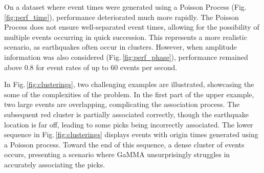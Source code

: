 \documentclass{scrreprt}
\begin{document}
On a dataset where event times were generated using a Poisson Process (Fig.\,\ref{fig:perf_time}), performance deteriorated much more rapidly. The Poisson Process does not ensure well-separated event times, allowing for the possibility of multiple events occurring in quick succession. This represents a more realistic scenario, as earthquakes often occur in clusters. However, when amplitude information was also considered (Fig.\,\ref{fig:perf_phase}), performance remained above 0.8 for event rates of up to 60 events per second.

In Fig.\,\ref{fig:clusterings}, two challenging examples are illustrated, showcasing the some of the complexities of the problem. In the first part of the upper example, two large events 
are overlapping, complicating the association process. The subsequent red cluster is partially associated correctly, though the earthquake location is far off, leading to some picks being incorrectly associated. The lower sequence in Fig.\,\ref{fig:clusterings} displays events with origin times generated using a Poisson process. Toward the end of this sequence, a dense cluster of events occurs, presenting a scenario where GaMMA unsurprisingly struggles in accurately associating the picks.
\end{document}
